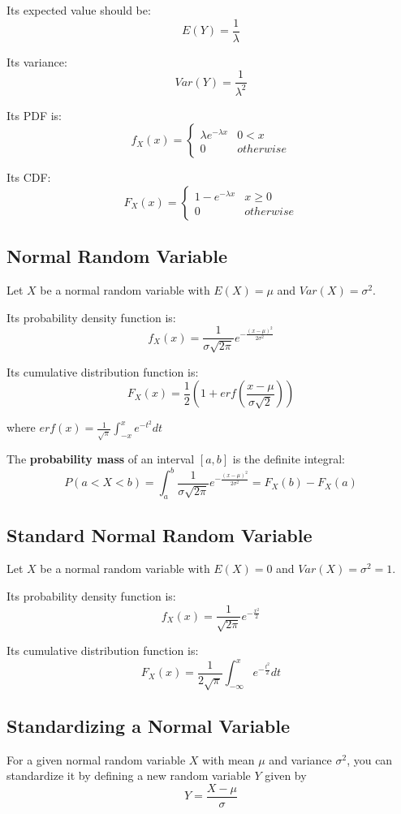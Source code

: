 \documentclass[11pt]{article}
\begin{document}
Its expected value should be:
$$E(Y) = \frac{1}{\lambda}$$

Its variance:
$$Var(Y) = \frac{1}{\lambda^2}$$

Its PDF is:
\begin{equation*}
  f_X(x) = \begin{cases}
    \lambda e^{-\lambda x} & 0 < x \\
    0 & otherwise
  \end{cases}
\end{equation*}

Its CDF:
\begin{equation*}
  F_X(x) = \begin{cases}
    1-e^{-\lambda x} & x \geq 0 \\
    0 & otherwise
  \end{cases}
\end{equation*}

\subsection{Normal Random Variable}
Let $X$ be a normal random variable with $E(X) = \mu$ and $Var(X) = \sigma^2$.

Its probability density function is:
$$f_X(x) = \frac{1}{\sigma \sqrt{2\pi}} e^{ -\frac{(x - \mu)^2}{2\sigma^2}}$$

Its cumulative distribution function is:
$$F_X(x) = \frac{1}{2} ( 1 + erf(\frac{x - \mu}{\sigma \sqrt{2}}))$$

where $erf(x) = \frac{1}{\sqrt{\pi}} \int_{-x}^{x} e^{-t^2} dt$

The \textbf{probability mass} of an interval $[a,b]$ is the definite integral:
$$P(a < X < b) = \int_{a}^{b} \frac{1}{\sigma \sqrt{2\pi}} e^{-\frac{(x - \mu)^2}{2\sigma^2}} = F_X(b) - F_X(a)$$

\subsection{Standard Normal Random Variable}
Let $X$ be a normal random variable with $E(X) = 0$ and $Var(X) = \sigma^2 = 1$.

Its probability density function is:
$$f_X(x) = \frac{1}{ \sqrt{2\pi}} e^{-\frac{x^2}{2}}$$

Its cumulative distribution function is:
$$F_X(x) = \frac{1}{2\sqrt{\pi}} \int_{-\infty}^{x} e^{- \frac{t^2}{2}} dt$$

\subsection{Standardizing a Normal Variable}
For a given normal random variable $X$ with mean $\mu$ and variance $\sigma^2$, you can standardize it by defining a new random variable $Y$ given by
$$Y = \frac{X - \mu}{\sigma}$$
\end{document}
